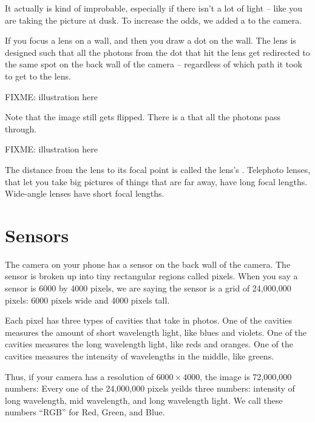 It actually is kind of improbable, especially if there isn't a lot of
light -- like you are taking the picture at dusk.  To increase the
odds, we added a  to the camera.

If you focus a lens on a wall, and then you draw a dot on the
wall. The lens is designed such that all the photons from the dot that
hit the lens get redirected to the same spot on the back wall of the
camera -- regardless of which path it took to get to the lens.

FIXME: illustration here

Note that the image still gets flipped.  There is a  that all the photons pass through.

FIXME: illustration here

The distance from the lens to its focal point is called the lens's
. Telephoto lenses, that let you take big
pictures of things that are far away, have long focal lengths.
Wide-angle lenses have short focal lengths.

\section{Sensors}

The camera on your phone has a sensor on the back wall of the
camera. The sensor is broken up into tiny rectangular regions called
pixels.  When you say a sensor is 6000 by 4000 pixels, we are saying
the sensor is a grid of 24,000,000 pixels: 6000 pixels wide and
4000 pixels tall.

Each pixel has three types of cavities that take in photos. One of the
cavities measures the amount of short wavelength light, like blues and
violets. One of the cavities measures the long wavelength light, like
reds and oranges. One of the cavities measures the intensity of
wavelengths in the middle, like greens.

Thus, if your camera has a resolution of $6000 \times 4000$, the image
is 72,000,000 numbers: Every one of the 24,000,000 pixels yeilds three
numbers: intensity of long wavelength, mid wavelength, and long
wavelength light. We call these numbers ``RGB'' for Red, Green, and
Blue.



